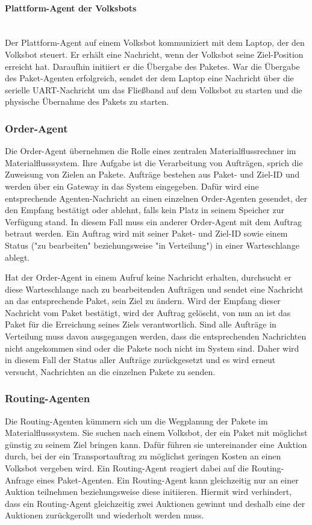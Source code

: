 \paragraph{Plattform-Agent der Volksbots}\mbox{}\\
Der Plattform-Agent auf einem Volksbot kommuniziert mit dem Laptop, der den Volksbot steuert. Er erhält eine Nachricht, wenn der Volksbot seine Ziel-Position erreicht hat. Daraufhin initiiert er die Übergabe des Paketes. War die Übergabe des Paket-Agenten erfolgreich, sendet der dem Laptop eine Nachricht über die serielle UART-Nachricht um das Fließband auf dem Volksbot zu starten und die physische Übernahme des Pakets zu starten.
\subsubsection{Order-Agent}
Die Order-Agent übernehmen die Rolle eines zentralen Materialflussrechner im Materialflusssystem. Ihre Aufgabe ist die Verarbeitung von Aufträgen, sprich die Zuweisung von Zielen an Pakete. Aufträge bestehen aus Paket- und Ziel-ID und werden über ein Gateway in das System eingegeben. Dafür wird eine entsprechende Agenten-Nachricht an einen einzelnen Order-Agenten gesendet, der den Empfang bestätigt oder ablehnt, falls kein Platz in seinem Speicher zur Verfügung stand. In diesem Fall muss ein anderer Order-Agent mit dem Auftrag betraut werden. Ein Auftrag wird mit seiner Paket- und Ziel-ID sowie einem Status ("zu bearbeiten" beziehungsweise "in Verteilung") in einer Warteschlange ablegt.

Hat der Order-Agent in einem Aufruf keine Nachricht erhalten, durchsucht er diese Warteschlange nach zu bearbeitenden Aufträgen und sendet eine Nachricht an das entsprechende Paket, sein Ziel zu ändern. Wird der Empfang dieser Nachricht vom Paket bestätigt, wird der Auftrag gelöscht, von nun an ist das Paket für die Erreichung seines Ziels verantwortlich. Sind alle Aufträge in Verteilung muss davon ausgegangen werden, dass die entsprechenden Nachrichten nicht angekommen sind oder die Pakete noch nicht im System sind. Daher wird in diesem Fall der Status aller Aufträge zurückgesetzt und es wird erneut versucht, Nachrichten an die einzelnen Pakete zu senden.
\subsubsection{Routing-Agenten}

Die Routing-Agenten kümmern sich um die Wegplanung der Pakete im Materialflusssystem. Sie suchen nach einem Volksbot, der ein Paket mit möglichst günstig zu seinem Ziel bringen kann. Dafür führen sie untereinander eine Auktion durch, bei der ein Transportauftrag zu möglichst geringen Kosten an einen Volksbot vergeben wird. Ein Routing-Agent reagiert dabei auf die Routing-Anfrage eines Paket-Agenten. Ein Routing-Agent kann gleichzeitig nur an einer Auktion teilnehmen beziehungsweise diese initiieren. Hiermit wird verhindert, dass ein Routing-Agent gleichzeitig zwei Auktionen gewinnt und deshalb eine der Auktionen zurückgerollt und wiederholt werden muss.

